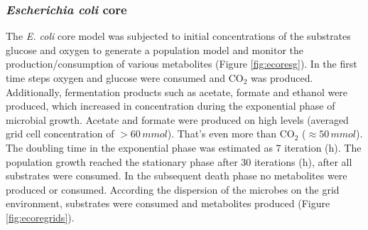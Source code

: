 \subsubsection{\textit{Escherichia coli} core}
The \textit{E. coli} core model was subjected to initial concentrations of the substrates glucose and oxygen to generate a population model and monitor the production/consumption of various metabolites (Figure \hyperref[fig:ecoresg]{\ref{fig:ecoresg}}). In the first time steps oxygen and glucose were consumed and CO$_2$ was produced. Additionally, fermentation products such as acetate, formate and ethanol were produced, which increased in concentration during the exponential phase of microbial growth. 
Acetate and formate were produced on high levels (averaged grid cell concentration of $> 60\, mmol$).
That's even more than CO$_2$ ($\approx 50\, mmol$).
The doubling time in the exponential phase was estimated as 7 iteration (h).
The population growth reached the stationary phase after 30 iterations (h), after all substrates were consumed. In the subsequent death phase no metabolites were produced or consumed.
According the dispersion of the microbes on the grid environment, substrates were consumed and metabolites produced (Figure \hyperref[fig:ecoregrids]{\ref{fig:ecoregrids}}).
